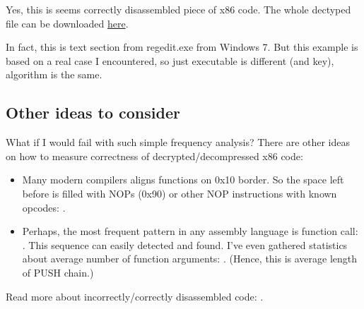 Yes, this is seems correctly disassembled piece of x86 code.
The whole dectyped file can be downloaded \href{https://github.com/dennis714/RE-for-beginners/blob/master/examples/simple_exec_crypto/files/decrypted.bin}{here}.

In fact, this is text section from regedit.exe from Windows 7.
But this example is based on a real case I encountered, so just executable is different (and key), algorithm is the same.

\subsection{Other ideas to consider}

What if I would fail with such simple frequency analysis?
There are other ideas on how to measure correctness of decrypted/decompressed x86 code:

\begin{itemize}

\item Many modern compilers aligns functions on 0x10 border.
So the space left before is filled with NOPs (0x90) or other NOP instructions with known opcodes: .

\item Perhaps, the most frequent pattern in any assembly language is function call:\\
.
This sequence can easily detected and found.
I've even gathered statistics about average number of function arguments: .
(Hence, this is average length of PUSH chain.)

\end{itemize}

Read more about incorrectly/correctly disassembled code: .

